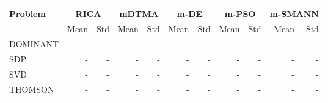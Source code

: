 \begin{table}[h]
\centering
\begin{tabular}{lrrrrrrrrrr}
\hline
Problem & \multicolumn{2}{c}{\bf RICA} & \multicolumn{2}{c}{\bf mDTMA} & \multicolumn{2}{c}{\bf m-DE} & \multicolumn{2}{c}{\bf m-PSO} & \multicolumn{2}{c}{\bf m-SMANN} \\
\hline
 & \small Mean & \small Std & \small Mean & \small Std & \small Mean & \small Std & \small Mean & \small Std & \small Mean & \small Std \\
\hline
DOMINANT & - & - & - & - & - & - & - & - & - & - \\
SDP & - & - & - & - & - & - & - & - & - & - \\
SVD & - & - & - & - & - & - & - & - & - & - \\
THOMSON & - & - & - & - & - & - & - & - & - & - \\
\hline
\end{tabular}
\end{table}
